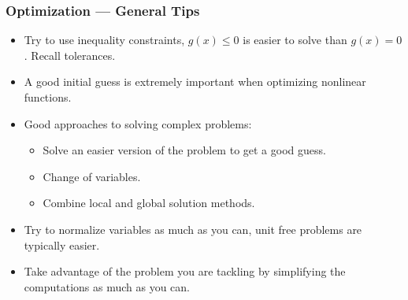 \documentclass[11pt,xcolor={svgnames},aspectratio=169,usepdftitle=false,notheorems]{beamer}
\begin{document}
\begin{frame}
  \frametitle{Optimization --- General Tips}
\begin{itemize}
  \item Try to use inequality constraints, $g(x) \leq 0$ is easier to solve than $g(x) = 0$. Recall tolerances.
  \item A good initial guess is extremely important when optimizing nonlinear functions.
  \item Good approaches to solving complex problems:
  \begin{itemize}
    \item Solve an easier version of the problem to get a good guess.
    \item Change of variables.
    \item Combine local and global solution methods.
  \end{itemize}
  \item Try to normalize variables as much as you can, unit free problems are typically easier.
  \item Take advantage of the problem you are tackling by simplifying the computations as much as you can.
\end{itemize}
\end{frame}
\end{document}
